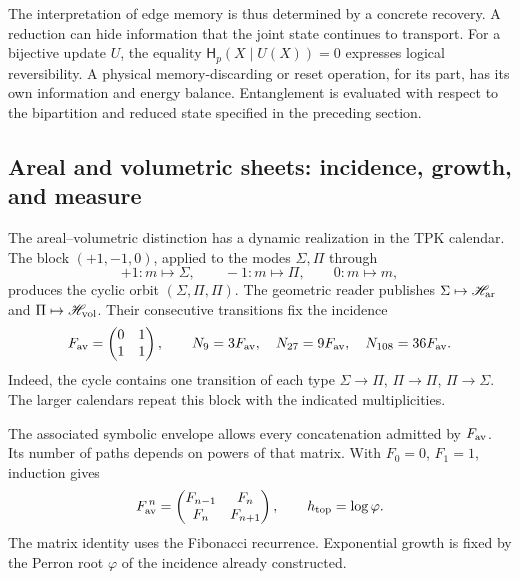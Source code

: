 The interpretation of edge memory is thus determined by
a concrete recovery. A reduction can hide information
that the joint state continues to transport. For a bijective update
\(U\), the equality \(\mathsf H_p(X\mid U(X))=0\) expresses
logical reversibility. A physical memory-discarding or reset
operation, for its part, has its own information and energy
balance. Entanglement is evaluated with respect to the bipartition and
reduced state specified in the preceding section.

\subsection{Areal and volumetric sheets: incidence, growth, and measure}
\label{ii:sec:ii-hojas-av}

The areal--volumetric distinction has a dynamic realization in the
TPK calendar. The block \((+1,-1,0)\), applied to the modes
\(\Sigma,\Pi\) through
\[
 +1:m\mapsto\Sigma,\qquad -1:m\mapsto\Pi,\qquad 0:m\mapsto m,
\]
produces the cyclic orbit \((\Sigma,\Pi,\Pi)\). The geometric reader
publishes \(\Sigma\mapsto\mathscr H_{\rm ar}\) and
\(\Pi\mapsto\mathscr H_{\rm vol}\). Their consecutive transitions
fix the incidence
\begin{equation}
 F_{\rm av}=\begin{pmatrix}0&1\\1&1\end{pmatrix},\qquad
 N_9=3F_{\rm av},\quad N_{27}=9F_{\rm av},\quad
 N_{108}=36F_{\rm av}.
 \label{ii:eq:ii-hojas-incidencia}
\end{equation}
Indeed, the cycle contains one transition of each type
\(\Sigma\to\Pi\), \(\Pi\to\Pi\), \(\Pi\to\Sigma\).
The larger calendars repeat this block with the indicated
multiplicities.

The associated symbolic envelope allows every concatenation
admitted by \(F_{\rm av}\). Its number of paths depends on
powers of that matrix. With \(F_0=0\), \(F_1=1\), induction gives
\begin{equation}
 F_{\rm av}^{\,n}=
 \begin{pmatrix}F_{n-1}&F_n\\F_n&F_{n+1}\end{pmatrix},
 \qquad h_{\rm top}=\log\varphi.
 \label{ii:eq:ii-hojas-fibonacci}
\end{equation}
The matrix identity uses the Fibonacci recurrence. Exponential
growth is fixed by the Perron root \(\varphi\) of the
incidence already constructed.

